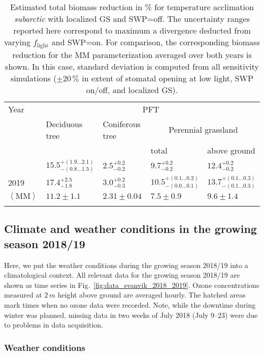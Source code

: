 \documentclass[bg, manuscript]{copernicus}
\begin{document}
\begin{table}[t]
  \caption{Estimated total biomass reduction in \unit{\%} for temperature acclimation \emph{subarctic} with localized GS and SWP=off. The uncertainty ranges reported here correspond to maximum a divergence deducted from varying $f_\mathrm{light}$ and SWP=on. For comparison, the corresponding biomass reduction for the MM parameterization averaged over both years is shown. In this case, standard deviation is computed from all sensitivity simulations ($\pm 20\,\unit{\%}$ in extent of stomatal opening at low light, SWP on/off, and localized GS).}
  \label{tab:biomass_reduction}
\begin{tabular}{lllll}
\tophline
Year & \multicolumn{4}{c}{PFT}\\
& Deciduous tree& Coniferous tree & \multicolumn{2}{c}{Perennial grassland}\\
& & & total & above ground\\
\middlehline
2018 & $15.5^{+(1.9...2.1)}_{-(0.8...1.5)}$ & $2.5^{+0.2}_{-0.2}$ & $9.7^{+0.2}_{-0.2}$ & $12.4^{+0.2}_{-0.2}$\\
2019 & $17.4^{+2.5}_{-1.8}$ & $3.0^{+0.2}_{-0.3}$ & $10.5^{+(0.1...0.2)}_{-(0.0...0.1)}$ & $13.7^{+(0.1...0.3)}_{-(0.1...0.3)}$\\
\middlehline
$\left<\mathrm{MM}\right>$ & $11.2\pm 1.1$ & $2.31\pm 0.04$ & $7.5\pm 0.9$ & $9.6\pm 1.4$\\
\bottomhline
\end{tabular}
\end{table}

\subsection{Climate and weather conditions in the growing season 2018/19}
\label{sec:stats}
Here, we put the weather conditions during the growing season 2018/19 into a climatological context. All relevant data for the growing season 2018/19 are shown as time series in Fig.~\ref{fig:data_svanvik_2018_2019}. Ozone concentrations measured at $2\,\unit{m}$ height above ground are averaged hourly. The hatched areas mark times when no ozone data were recorded. Note, while the downtime during winter was planned, missing data in two weeks of July 2018 (July 9--23) were due to problems in data acquisition.

\subsubsection{Weather conditions}
\label{subsec:weather}
\end{document}

